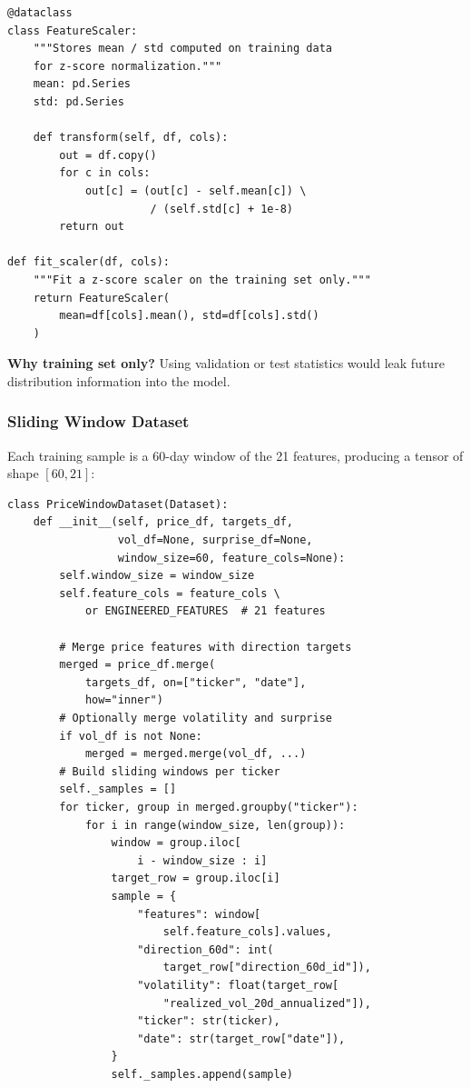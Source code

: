 \documentclass[12pt,a4paper]{article}
\begin{document}
\begin{lstlisting}[caption={Feature normalization (src/data/preprocessing.py)}]
@dataclass
class FeatureScaler:
    """Stores mean / std computed on training data
    for z-score normalization."""
    mean: pd.Series
    std: pd.Series

    def transform(self, df, cols):
        out = df.copy()
        for c in cols:
            out[c] = (out[c] - self.mean[c]) \
                      / (self.std[c] + 1e-8)
        return out

def fit_scaler(df, cols):
    """Fit a z-score scaler on the training set only."""
    return FeatureScaler(
        mean=df[cols].mean(), std=df[cols].std()
    )
\end{lstlisting}

\textbf{Why training set only?} Using validation or test statistics would leak future distribution information into the model.

\subsubsection{Sliding Window Dataset}

Each training sample is a 60-day window of the 21 features, producing a tensor of shape $[60, 21]$:

\begin{lstlisting}[caption={PriceWindowDataset (src/data/price\_dataset.py)}]
class PriceWindowDataset(Dataset):
    def __init__(self, price_df, targets_df,
                 vol_df=None, surprise_df=None,
                 window_size=60, feature_cols=None):
        self.window_size = window_size
        self.feature_cols = feature_cols \
            or ENGINEERED_FEATURES  # 21 features

        # Merge price features with direction targets
        merged = price_df.merge(
            targets_df, on=["ticker", "date"],
            how="inner")
        # Optionally merge volatility and surprise
        if vol_df is not None:
            merged = merged.merge(vol_df, ...)
        # Build sliding windows per ticker
        self._samples = []
        for ticker, group in merged.groupby("ticker"):
            for i in range(window_size, len(group)):
                window = group.iloc[
                    i - window_size : i]
                target_row = group.iloc[i]
                sample = {
                    "features": window[
                        self.feature_cols].values,
                    "direction_60d": int(
                        target_row["direction_60d_id"]),
                    "volatility": float(target_row[
                        "realized_vol_20d_annualized"]),
                    "ticker": str(ticker),
                    "date": str(target_row["date"]),
                }
                self._samples.append(sample)
\end{lstlisting}
\end{document}
